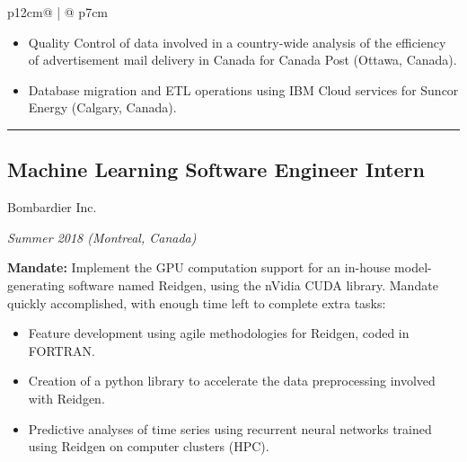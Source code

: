 \documentclass[letterpaper, 11pt]{article}
\begin{document}
\begin{tabular}{p{12cm}@{\hspace{1em}} | @{\hspace{1em}} p{7cm}}
\begin{adjustwidth}{1em}{1em}
                \begin{itemize}
                    \item Quality Control of data involved in a country-wide analysis of the efficiency of advertisement mail delivery in Canada for Canada Post (Ottawa, Canada).

                    \item Database migration and ETL operations using IBM Cloud services for Suncor Energy (Calgary, Canada).
                \end{itemize}
            \end{adjustwidth}

            \begin{adjustwidth}{4em}{4em}
                {\color{lightgray}\rule{\linewidth}{1pt}}           
            \end{adjustwidth}
        \subsection*{Machine Learning Software Engineer Intern}
            \hspace{1em} {\large Bombardier Inc.}
            
            \hspace{2em} \textit{Summer 2018 (Montreal, Canada)}
            \vspace{0.3em}
            \begin{adjustwidth}{1em}{1em}
                \textbf{Mandate:} Implement the GPU computation support for an in-house model-generating software named Reidgen, using the nVidia CUDA library. Mandate quickly accomplished, with enough time  left to complete extra tasks:
            
                \begin{itemize}
                    \item Feature development using agile methodologies for Reidgen, coded in FORTRAN.
                    \item Creation of a python library to accelerate the data preprocessing involved with Reidgen.
            
                    \item Predictive analyses of time series using recurrent neural networks trained using Reidgen on computer clusters (HPC).
                \end{itemize}
           \end{adjustwidth}
        

\end{tabular}
\end{document}
